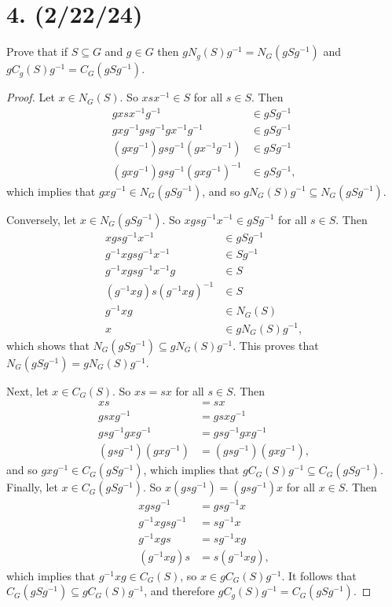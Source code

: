 \documentclass{article}
\begin{document}
\section*{4. (2/22/24)}

Prove that if $S \subseteq G$ and $g \in G$ then $gN_g(S)g^{-1} = N_G(gSg^{-1})$ and $gC_g(S)g^{-1} = C_G(gSg^{-1})$.

\begin{proof}
    Let $x \in N_G(S)$. So $xsx^{-1} \in S$ for all $s \in S$. Then
        \begin{align*}
            gxsx^{-1}g^{-1} &\in gSg^{-1} \\
            gxg^{-1}gsg^{-1}gx^{-1}g^{-1} &\in gSg^{-1} \\
            (gxg^{-1})gsg^{-1}(gx^{-1}g^{-1}) &\in gSg^{-1} \\
            (gxg^{-1})gsg^{-1}(gxg^{-1})^{-1} &\in gSg^{-1},
        \end{align*}
    which implies that $gxg^{-1} \in N_G(gSg^{-1})$, and so $gN_G(S)g^{-1} \subseteq N_G(gSg^{-1})$.

    Conversely, let $x \in N_G(gSg^{-1})$. So $xgsg^{-1}x^{-1} \in gSg^{-1}$ for all $s \in S$. Then
        \begin{align*}
            xgsg^{-1}x^{-1} &\in gSg^{-1} \\
            g^{-1}xgsg^{-1}x^{-1} &\in Sg^{-1} \\
            g^{-1}xgsg^{-1}x^{-1}g &\in S \\
            (g^{-1}xg)s(g^{-1}xg)^{-1} &\in S \\
            g^{-1}xg &\in N_G(S) \\
            x &\in gN_G(S)g^{-1},
        \end{align*}
    which shows that $N_G(gSg^{-1}) \subseteq gN_G(S)g^{-1}$. This proves that $N_G(gSg^{-1}) = gN_G(S)g^{-1}$.

    Next, let $x \in C_G(S)$. So $xs = sx$ for all $s \in S$. Then
        \begin{align*}
            xs &= sx \\
            gsxg^{-1} &= gsxg^{-1} \\
            gsg^{-1}gxg^{-1} &= gsg^{-1}gxg^{-1} \\
            (gsg^{-1})(gxg^{-1}) &= (gsg^{-1})(gxg^{-1}),
        \end{align*}
        and so $gxg^{-1} \in C_G(gSg^{-1})$, which implies that $gC_G(S)g^{-1} \subseteq C_G(gSg^{-1})$.
    Finally, let $x \in C_G(gSg^{-1})$. So $x(gsg^{-1}) = (gsg^{-1})x$ for all $x \in S$. Then
        \begin{align*}
            xgsg^{-1} &= gsg^{-1}x \\
            g^{-1}xgsg^{-1} &= sg^{-1}x \\
            g^{-1}xgs &= sg^{-1}xg \\
            (g^{-1}xg)s &= s(g^{-1}xg),
        \end{align*}
        which implies that $g^{-1}xg \in C_G(S)$, so $x \in gC_G(S)g^{-1}$. It follows that $C_G(gSg^{-1}) \subseteq gC_G(S)g^{-1}$, and therefore $gC_g(S)g^{-1} = C_G(gSg^{-1})$.
\end{proof}
\end{document}
